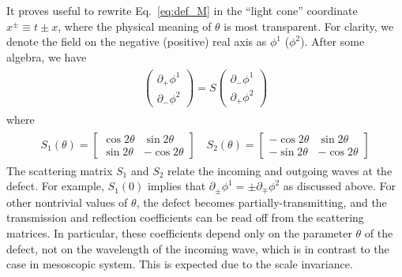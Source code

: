 It proves useful to rewrite Eq.~\eqref{eq:def_M} in the ``light cone'' coordinate $x^\pm\equiv t\pm x$, where the physical meaning of $\theta$ is most transparent. For clarity, we denote the field on the negative (positive) real axis as $\phi^1$ ($\phi^2$).
After some algebra, we have
\begin{eqnarray}\begin{aligned}
\label{eq:def_S}
\begin{pmatrix}
\partial_+\phi^1\\
\partial_-\phi^2
\end{pmatrix}
=S
\begin{pmatrix}
\partial_-\phi^1\\
\partial_+\phi^2
\end{pmatrix}
\end{aligned}\end{eqnarray}
where 
\begin{eqnarray}\begin{aligned}
\label{eq:S1_S2}
S_1(\theta)=\begin{bmatrix}
\cos 2\theta & \sin 2\theta \\
\sin 2\theta & -\cos 2\theta
\end{bmatrix}\quad
S_2(\theta)=\begin{bmatrix}
-\cos 2\theta & \sin 2\theta \\
-\sin 2\theta & -\cos 2\theta
\end{bmatrix}
\end{aligned}\end{eqnarray}
The scattering matrix $S_1$ and $S_2$ relate the incoming and outgoing waves at the defect. For example, $S_1(0)$ implies that $\partial_\pm\phi^{1}=\pm\partial_\mp\phi^{2}$ as discussed above. For other nontrivial values of $\theta$, the defect becomes partially-transmitting, and the transmission and reflection coefficients can be read off from the scattering matrices. In particular, these coefficients depend only on the parameter $\theta$ of the defect, not on the wavelength of the incoming wave, which is in contrast to the case in mesoscopic system.\cite{datta_1995} This is expected due to the scale invariance. 

